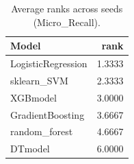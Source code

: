 \begin{table}[t]
\centering
\begin{tabular}{lr}
\toprule
Model & rank \\
\midrule
LogisticRegression & 1.3333 \\
sklearn_SVM & 2.3333 \\
XGBmodel & 3.0000 \\
GradientBoosting & 3.6667 \\
random_forest & 4.6667 \\
DTmodel & 6.0000 \\
\bottomrule
\end{tabular}
\caption{Average ranks across seeds (Micro_Recall).}
\label{tab:avg_rank_Micro_Recall}
\end{table}